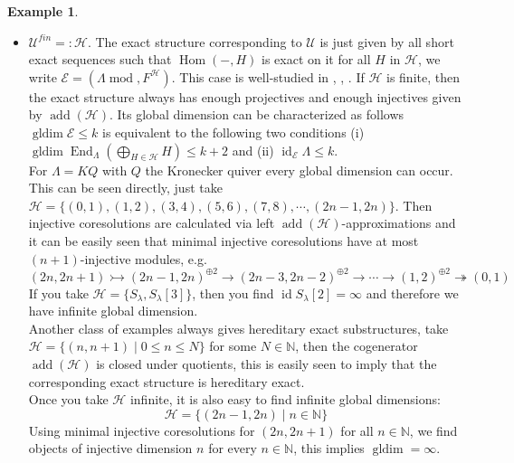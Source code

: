 \documentclass[11pt,a4paper]{amsart}
\theoremstyle{plain}
\theoremstyle{definition}
\newtheorem{exa}[thm]{Example}
\DeclareMathOperator{\Hom}{Hom}
\DeclareMathOperator{\End}{End}
\DeclareMathOperator{\modu}{mod}
\DeclareMathOperator{\idim}{id}
\DeclareMathOperator{\gldim}{gldim}
\newcommand{\defl}{\twoheadrightarrow}
\newcommand{\infl}{\rightarrowtail}
\newcommand{\La}{\Lambda}
\newcommand{\mcE}{\mathcal{E}}
\newcommand{\mcH}{\mathcal{H}}
\newcommand{\mcU}{\mathcal{U}}
\DeclareMathOperator{\add}{add}
\begin{document}
\begin{exa}
\begin{itemize}
\item[(II)] $\mcU^{fin}=:\mcH$. The exact structure corresponding to $\mcU$ is just given by all short exact sequences such that $\Hom(-,H)$ is exact on it for all $H$ in $\mcH$,
we write $\mcE=(\La \modu , F^\mcH)$. This case is well-studied in \cite{ASoI}, \cite{ASoII}, \cite{ASoIII}. If $\mcH$ is finite, then the exact structure always has enough projectives and enough injectives given by $\add (\mcH)$. Its global dimension can be characterized as follows $\gldim \mcE\leq k$ is equivalent to the following two conditions (i) $\gldim \End_{\La} (\bigoplus_{H\in \mcH} H) \leq k+2$ and (ii) $\idim_{\mcE} \La \leq k$. \\
For $\La=KQ$ with $Q$ the Kronecker quiver every global dimension can occur. This can be seen directly, just take 
$\mcH=\{(0,1),(1,2),(3,4), (5,6), (7,8), \cdots ,(2n-1, 2n)\}$. Then injective coresolutions are calculated via left $\add (\mcH)$-approximations and it can be easily seen that minimal injective coresolutions have at most $(n+1)$-injective modules, e.g. 
\[
(2n,2n+1) \infl (2n-1,2n)^{\oplus 2} \to (2n-3,2n-2)^{\oplus 2} \to\cdots \to (1,2)^{\oplus 2} \defl (0,1) 
\]
If you take $\mcH=\{S_{\lambda}, S_{\lambda}[3]\}$, then you find $\idim S_{\lambda} [2]= \infty$ and therefore we have infinite global dimension.\\
Another class of examples always gives hereditary exact substructures, take $\mcH=\{(n, n+1)\mid 0 \leq n \leq N\}$ for some $N\in \mathbb{N}$, then the cogenerator $\add(\mcH)$ is closed under quotients, this is easily seen to imply that the corresponding exact structure is hereditary exact. \\
Once you take $\mcH$ infinite, it is also easy to find infinite global dimensions: 
\[
\mcH= \{(2n-1,2n)\mid n \in \mathbb{N}\}
\]
Using minimal injective coresolutions for $(2n, 2n+1)$ for all $n \in \mathbb{N}$, we find objects of injective dimension $n$ for every $n \in\mathbb{N}$, this implies $\gldim =\infty$. 
\end{itemize}
\end{exa}
\end{document}
